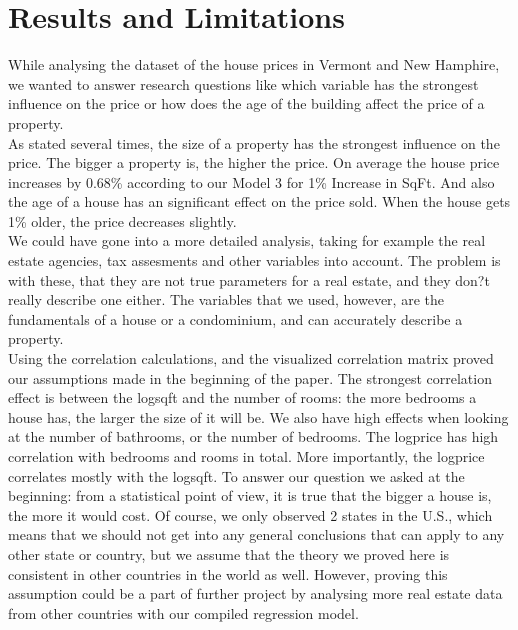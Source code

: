

\section{Results and Limitations}\label{Sec:Results}



While analysing the dataset of the house prices in Vermont and New Hamphire, we wanted to answer research questions like which variable has the strongest influence on the price or how does the age of the building affect the price of a property. \\
As stated several times, the size of a property has the strongest influence on the price. The bigger a property is, the higher the price. On average the house price increases by 0.68\% according to our Model 3 for 1\% Increase in SqFt. And also the age of a house has an significant effect on the price sold. When the house gets 1\% older, the price decreases slightly. \\
We could have gone into a more detailed analysis, taking for example the real estate agencies, tax assesments and other variables into account. The problem is with these, that they are not true parameters for a real estate, and they don?t really describe one either. The variables that we used, however, are the fundamentals of a house or a condominium, and can accurately describe a property. \\

Using the correlation calculations, and the visualized correlation matrix proved our assumptions made in the beginning of the paper. The strongest correlation effect is between the logsqft and the number of rooms: the more bedrooms a house has, the larger the size of it will be. We also have high effects when looking at the number of bathrooms, or the number of bedrooms. The logprice has high correlation with bedrooms and rooms in total. More importantly, the logprice correlates mostly with the logsqft. To answer our question we asked at the beginning: from a statistical point of view, it is true that the bigger a house is, the more it would cost. Of course, we only observed 2 states in the U.S., which means that we should not get into any general conclusions that can apply to any other state or country, but we assume that the theory we proved here is consistent in other countries in the world as well. However, proving this assumption could be a part of further project by analysing more real estate data from other countries with our compiled regression model.\\
